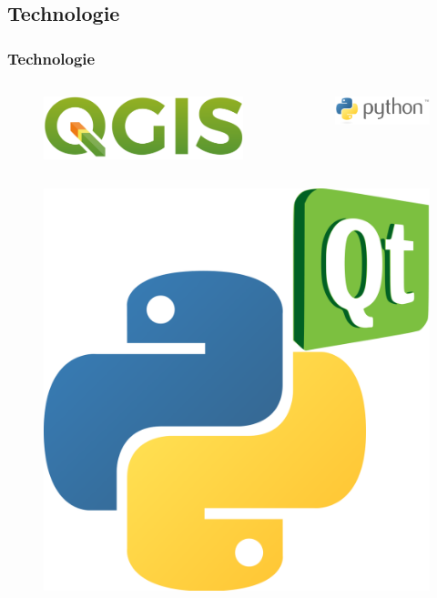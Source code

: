 \documentclass{beamer}
\begin{document}
\begin{frame}
\section{Technologie}
\frametitle{Technologie}


	
	\begin{columns}
			\begin{figure}[H] \centering
				\includegraphics[scale=0.12]{./pictures/qgis.png}
			\end{figure}
			\begin{figure}[H] \centering
				\includegraphics[scale=0.3]{./pictures/python.png}

			\end{figure}
	\end{columns}
\begin{figure}[H] \centering	
	\includegraphics[scale=0.035]{./pictures/pyqt.png}
\end{figure}
	


\end{frame}
\end{document}
